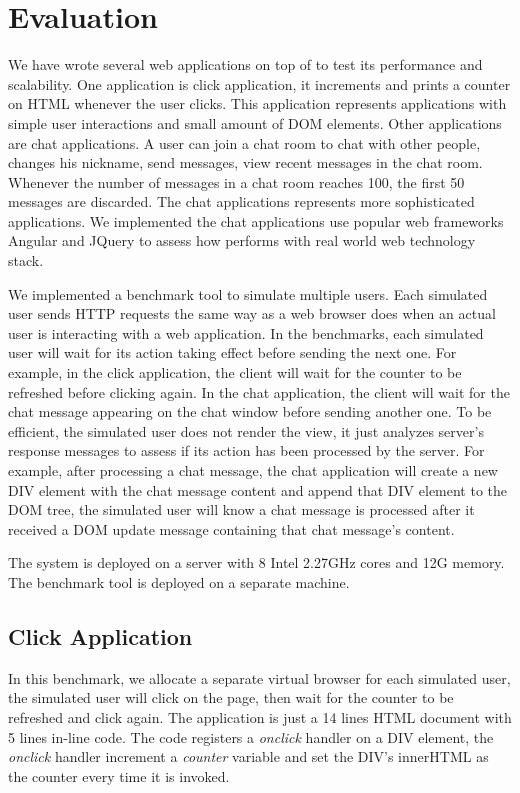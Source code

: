 \section{Evaluation}
\label{sec:eval}
We have wrote several web applications on top of \cb{} to test its
performance and scalability.
One application is click application,
it increments and prints a counter on HTML whenever the user clicks.
This application represents applications with simple user interactions and small amount of DOM elements.
Other applications are chat applications.
A user can join a chat room to chat with other people,
changes his nickname, send messages, view recent messages in the chat room.
Whenever the number of messages in a chat room reaches 100, the first 50 messages
are discarded.
The chat applications represents more sophisticated applications.
We implemented the chat applications use popular web frameworks Angular and JQuery
to assess how \cb{} performs with real world web technology stack.

\chatroomfig{}

We implemented a benchmark tool to simulate multiple users.
Each simulated user sends HTTP requests the same way as
a web browser does when an actual user is interacting with a web application.
In the benchmarks, each simulated user will wait for its action taking effect before 
sending the next one.
For example, in the click application, the client will wait for the counter
to be refreshed before clicking again.
In the chat application, the client will wait for
the chat message appearing on the chat window before sending another one.
To be efficient, the simulated user does not render the view, 
it just analyzes server's response messages to assess 
if its action has been processed by the server.
For example, after processing a chat message, 
the chat application will create a new DIV element with the chat message content
and append that DIV element to the DOM tree, 
the simulated user will know a chat message is processed after it received
a DOM update message containing that chat message's content.

The \cb{} system is deployed on a server with 8 Intel 2.27GHz cores and 12G memory.
The benchmark tool is deployed on a separate machine.

\subsection{Click Application}
In this benchmark,
we allocate a separate virtual browser for each simulated user,
the simulated user will click on the page, 
then wait for the counter to be refreshed and click again.
The application is just a 14 lines HTML document with 5 lines in-line \js{} code.
The \js{} code registers a \emph{onclick} handler on a DIV element,
the \emph{onclick} handler increment a \emph{counter} variable and set the DIV's innerHTML as
the counter every time it is invoked.


